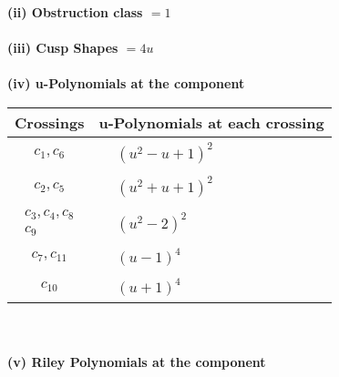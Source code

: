 \documentclass[1p]{elsarticle_modified}
\theoremstyle{definition}
\begin{document}
\flushleft \textbf{(ii) Obstruction class $= 1$}\\~\\
\flushleft \textbf{(iii) Cusp Shapes $= 4 u$}\\~\\
\newpage\renewcommand{\arraystretch}{1}
\flushleft \textbf{(iv) u-Polynomials at the component}\newline \\
\begin{tabular}{m{50pt}|m{274pt}}
Crossings & \hspace{64pt}u-Polynomials at each crossing \\
\hline $$\begin{aligned}c_{1},c_{6}\end{aligned}$$&$\begin{aligned}
&(u^2- u+1)^2
\end{aligned}$\\
\hline $$\begin{aligned}c_{2},c_{5}\end{aligned}$$&$\begin{aligned}
&(u^2+u+1)^2
\end{aligned}$\\
\hline $$\begin{aligned}c_{3},c_{4},c_{8}\\c_{9}\end{aligned}$$&$\begin{aligned}
&(u^2-2)^2
\end{aligned}$\\
\hline $$\begin{aligned}c_{7},c_{11}\end{aligned}$$&$\begin{aligned}
&(u-1)^4
\end{aligned}$\\
\hline $$\begin{aligned}c_{10}\end{aligned}$$&$\begin{aligned}
&(u+1)^4
\end{aligned}$\\
\hline
\end{tabular}\\~\\
\newpage\renewcommand{\arraystretch}{1}
\flushleft \textbf{(v) Riley Polynomials at the component}\newline \\
\end{document}
